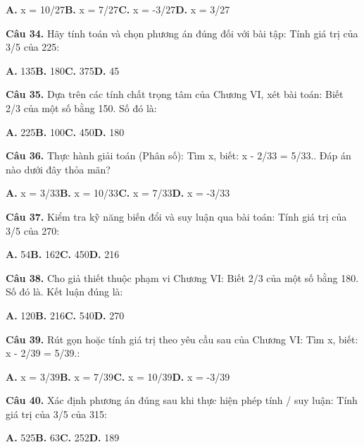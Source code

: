 \documentclass[11pt,a4paper]{article}
\begin{document}
\hspace*{1.5em}\textbf{A.} x = 10/27\quad\quad \textbf{B.} x = 7/27\quad\quad \textbf{C.} x = -3/27\quad\quad \textbf{D.} x = 3/27\par\vspace{2pt}
\textbf{\color{primary} Câu 34.} Hãy tính toán và chọn phương án đúng đối với bài tập: Tính giá trị của 3/5 của 225:\par
\hspace*{1.5em}\textbf{A.} 135\quad\quad \textbf{B.} 180\quad\quad \textbf{C.} 375\quad\quad \textbf{D.} 45\par\vspace{2pt}
\textbf{\color{primary} Câu 35.} Dựa trên các tính chất trọng tâm của Chương VI, xét bài toán: Biết 2/3 của một số bằng 150. Số đó là:\par
\hspace*{1.5em}\textbf{A.} 225\quad\quad \textbf{B.} 100\quad\quad \textbf{C.} 450\quad\quad \textbf{D.} 180\par\vspace{2pt}
\textbf{\color{primary} Câu 36.} Thực hành giải toán (Phân số): Tìm x, biết: x - 2/33 = 5/33.. Đáp án nào dưới đây thỏa mãn?\par
\hspace*{1.5em}\textbf{A.} x = 3/33\quad\quad \textbf{B.} x = 10/33\quad\quad \textbf{C.} x = 7/33\quad\quad \textbf{D.} x = -3/33\par\vspace{2pt}
\textbf{\color{primary} Câu 37.} Kiểm tra kỹ năng biến đổi và suy luận qua bài toán: Tính giá trị của 3/5 của 270:\par
\hspace*{1.5em}\textbf{A.} 54\quad\quad \textbf{B.} 162\quad\quad \textbf{C.} 450\quad\quad \textbf{D.} 216\par\vspace{2pt}
\textbf{\color{primary} Câu 38.} Cho giả thiết thuộc phạm vi Chương VI: Biết 2/3 của một số bằng 180. Số đó là. Kết luận đúng là:\par
\hspace*{1.5em}\textbf{A.} 120\quad\quad \textbf{B.} 216\quad\quad \textbf{C.} 540\quad\quad \textbf{D.} 270\par\vspace{2pt}
\textbf{\color{primary} Câu 39.} Rút gọn hoặc tính giá trị theo yêu cầu sau của Chương VI: Tìm x, biết: x - 2/39 = 5/39.:\par
\hspace*{1.5em}\textbf{A.} x = 3/39\quad\quad \textbf{B.} x = 7/39\quad\quad \textbf{C.} x = 10/39\quad\quad \textbf{D.} x = -3/39\par\vspace{2pt}
\textbf{\color{primary} Câu 40.} Xác định phương án đúng sau khi thực hiện phép tính / suy luận: Tính giá trị của 3/5 của 315:\par
\hspace*{1.5em}\textbf{A.} 525\quad\quad \textbf{B.} 63\quad\quad \textbf{C.} 252\quad\quad \textbf{D.} 189\par\vspace{2pt}
\end{document}
